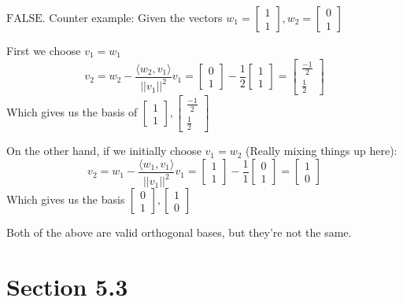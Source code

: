 \documentclass[10pt,letterpaper]{article}
\begin{document}
	$\boxed{\text{FALSE}}$. Counter example:  Given the vectors $ w_1 = \begin{bmatrix}
	1 \\ 1
	\end{bmatrix}, w_2 = \begin{bmatrix}
	0 \\ 1
	\end{bmatrix}$ 
	
	First we choose $v_1 = w_1$
	$$
	v_2 = w_2 - \frac{\langle w_2, v_1 \rangle}{||v_1||^2} v_1 = \begin{bmatrix}
	0 \\ 1
	\end{bmatrix} - \frac{1}{2} \begin{bmatrix}
	1 \\ 1
	\end{bmatrix} = \begin{bmatrix}
	\frac{-1}{2} \\ \frac{1}{2}
	\end{bmatrix}
	$$
	Which gives us the basis of $\begin{bmatrix}
	1 \\ 1
	\end{bmatrix}, \begin{bmatrix}
	\frac{-1}{2} \\ \frac{1}{2}
	\end{bmatrix}$ 
	
	On the other hand, if we initially choose $v_1 = w_2$ (Really mixing things up here): 
	$$
	v_2 = w_1 - \frac{\langle w_1, v_1 \rangle}{||v_1||^2} v_1 = \begin{bmatrix}
	1 \\ 1
	\end{bmatrix} - \frac{1}{1} \begin{bmatrix}
	0 \\ 1
	\end{bmatrix} = \begin{bmatrix}
	1 \\ 0
	\end{bmatrix}
	$$ 
	Which gives us the basis $\begin{bmatrix}
	0 \\ 1
	\end{bmatrix}, \begin{bmatrix}
	1 \\ 0
	\end{bmatrix}$ 
	
	Both of the above are valid orthogonal bases, but they're not the same. 
	\section*{Section 5.3}
\end{document}
